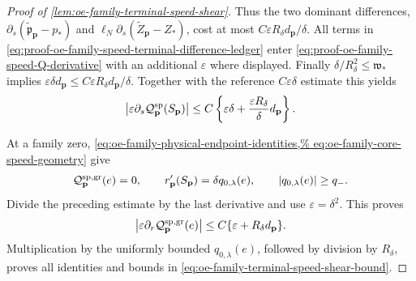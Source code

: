 \begin{proof}[Proof of
\cref{lem:oe-family-terminal-speed-shear}]
Thus the two dominant differences,
\(\partial_s(\widetilde{\mathfrak p}_{\mathbf p}-p_*)\) and
\(\ell_N\partial_s(\widetilde Z_{\mathbf p}-Z_*)\), cost at most
\(C\varepsilon R_\delta d_{\mathbf p}/\delta\).  All terms in
\cref{eq:proof-oe-family-speed-terminal-difference-ledger} enter
\cref{eq:proof-oe-family-speed-Q-derivative} with an additional
\(\varepsilon\) where displayed.  Finally
\(\delta/R_\delta^2\le\mathfrak w_*\) implies
\(\varepsilon\delta d_{\mathbf p}
 \le C\varepsilon R_\delta d_{\mathbf p}/\delta\).
Together with the reference \(C\varepsilon\delta\) estimate this yields
\[
 \left|\varepsilon\partial_s
       \mathcal Q_{\mathbf p}^{\rm sp}(S_{\mathbf p})\right|
 \le C\left\{\varepsilon\delta
       +\frac{\varepsilon R_\delta}{\delta}d_{\mathbf p}\right\}.
\]

At a family zero,
\cref{eq:oe-family-physical-endpoint-identities,%
eq:oe-family-core-speed-geometry} give
\[
 \mathcal Q_{\mathbf p}^{\rm sp,gr}(e)=0,\qquad
 r_{\mathbf p}'(S_{\mathbf p})
 =\delta q_{0,\lambda}(e),\qquad
 |q_{0,\lambda}(e)|\ge q_-.
\]
Divide the preceding estimate by the last derivative and use
\(\varepsilon=\delta^2\).  This proves
\[
 \left|\varepsilon\partial_r
       \mathcal Q_{\mathbf p}^{\rm sp,gr}(e)\right|
 \le C\{\varepsilon+R_\delta d_{\mathbf p}\}.
\]
Multiplication by the uniformly bounded \(q_{0,\lambda}(e)\), followed
by division by \(R_\delta\), proves all identities and bounds in
\cref{eq:oe-family-terminal-speed-shear-bound}.


\end{proof}
